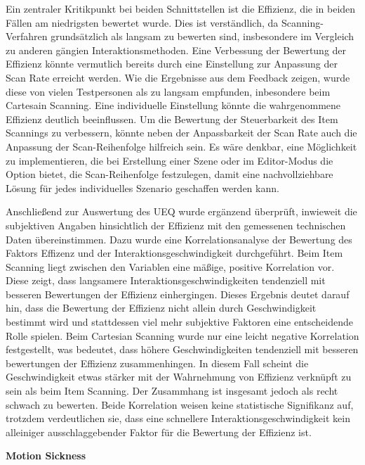 Ein zentraler Kritikpunkt bei beiden Schnittstellen ist die Effizienz, die in beiden Fällen am niedrigsten bewertet wurde. Dies ist verständlich, da Scanning-Verfahren grundsätzlich als langsam zu bewerten sind, insbesondere im Vergleich zu anderen gängien Interaktionsmethoden. Eine Verbessung der Bewertung der Effizienz könnte vermutlich bereits durch eine Einstellung zur Anpassung der Scan Rate erreicht werden. Wie die Ergebnisse aus dem Feedback zeigen, wurde diese von vielen Testpersonen als zu langsam empfunden, inbesondere beim Cartesain Scanning. Eine individuelle Einstellung könnte die wahrgenommene Effizienz deutlich beeinflussen. 
Um die Bewertung der Steuerbarkeit des Item Scannings zu verbessern, könnte neben der Anpassbarkeit der Scan Rate auch die Anpassung der Scan-Reihenfolge hilfreich sein. Es wäre denkbar, eine Möglichkeit zu implementieren, die bei Erstellung einer Szene oder im Editor-Modus die Option bietet, die Scan-Reihenfolge festzulegen, damit eine nachvollziehbare Lösung für jedes individuelles Szenario geschaffen werden kann. 

Anschließend zur Auswertung des UEQ wurde ergänzend überprüft, inwieweit die subjektiven Angaben hinsichtlich der Effizienz mit den gemessenen technischen Daten übereinstimmen. Dazu wurde eine Korrelationsanalyse der Bewertung des Faktors Effizenz und der Interaktionsgeschwindigkeit durchgeführt. 
Beim Item Scanning liegt zwischen den Variablen eine mäßige, positive Korrelation vor. Diese zeigt, dass langsamere Interaktionsgeschwindigkeiten tendenziell mit besseren Bewertungen der Effizienz einhergingen. Dieses Ergebnis deutet darauf hin, dass die Bewertung der Effizienz nicht allein durch Geschwindigkeit bestimmt wird und stattdessen viel mehr subjektive Faktoren eine entscheidende Rolle spielen.
Beim Cartesian Scanning wurde nur eine leicht negative Korrelation festgestellt, was bedeutet, dass höhere Geschwindigkeiten tendenziell mit besseren bewertungen der Effizienz zusammenhingen. In diesem Fall scheint die Geschwindigkeit etwas stärker mit der Wahrnehmung von Effizienz verknüpft zu sein als beim Item Scanning. Der Zusammhang ist insgesamt jedoch als recht schwach zu bewerten. Beide Korrelation weisen keine statistische Signifikanz auf, trotzdem verdeutlichen sie, dass eine schnellere Interaktionsgeschwindigkeit kein alleiniger ausschlaggebender Faktor für die Bewertung der Effizienz ist.

\textbf{Motion Sickness}

